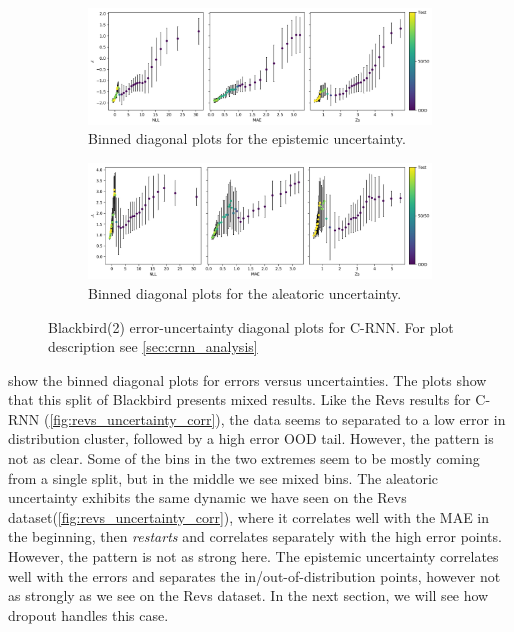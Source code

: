 \begin{figure}[htbp]
  \centering
    \begin{subfigure}[b]{\textwidth}
        \includegraphics[width=\textwidth]{Experiments/figs/binned/bb2_crnn_epistemic.png}
        \caption{Binned diagonal plots for the epistemic uncertainty.}
    \end{subfigure}
    
    \begin{subfigure}[b]{\textwidth}
        \includegraphics[width=\textwidth]{Experiments/figs/binned/bb2_crnn_aleatoric.png}
        \caption{Binned diagonal plots for the aleatoric uncertainty.}
  \end{subfigure}
    \caption[Blackbird(2) error-uncertainty diagonal plots for C-RNN]{Blackbird(2) error-uncertainty diagonal plots for C-RNN. For plot description see \cref{sec:crnn_analysis}}
    \label{fig:bb2_uncertainty_corr}
\end{figure}

 show the binned diagonal plots for errors versus uncertainties. The plots show that this split of Blackbird presents mixed results. Like the Revs results for C-RNN (\cref{fig:revs_uncertainty_corr}), the data seems to separated to a low error in distribution cluster, followed by a high error OOD tail. However, the pattern is not as clear.
Some of the bins in the two extremes seem to be mostly coming from a single split, but in the middle we see mixed bins. 
The aleatoric uncertainty exhibits the same dynamic we have seen on the Revs dataset(\cref{fig:revs_uncertainty_corr}), where it correlates well with the MAE in the beginning, then \emph{restarts} and correlates separately with the high error points. However, the pattern is not as strong here. 
The epistemic uncertainty correlates well with the errors and separates the in/out-of-distribution points, however not as strongly as we see on the Revs dataset. In the next section, we will see how dropout handles this case. 


